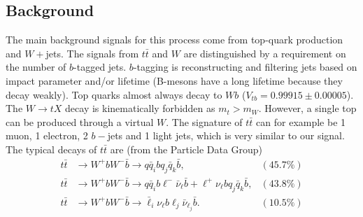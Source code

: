 \documentclass[11pt]{article}
\begin{document}
\subsection*{Background}
\begin{flushleft}
The main background signals for this process come from top-quark production and $W+$jets. The signals from $t \bar{t}$ and $W$ are distinguished by a requirement on the number of $b$-tagged jets. $b$-tagging is reconstructing and filtering jets based on impact parameter and/or lifetime (B-mesons have a long lifetime because they decay weakly). Top quarks almost always decay to $Wb$ ($V_{tb}=0.99915 \pm 0.00005$). The $W \rightarrow tX$ decay is kinematically forbidden as $m_t > m_W$. However, a single top can be produced through a virtual $W$. The signature of $t \bar{t}$ can for example be 1 muon, 1 electron, 2 $b-$jets and 1 light jets, which is very similar to our signal. The typical decays of $t \bar{t}$ are (from the Particle Data Group)
\begin{align*}
t \bar{t} & \rightarrow W^+b W^- \bar{b} \rightarrow q \bar{q}_i b q_j \bar{q}_k \bar{b}, & (45.7\%) \\
t \bar{t} & \rightarrow W^+ b W^- \bar{b} \rightarrow q \bar{q}_i b \ell^- \bar{\nu}_{\ell} \bar{b} + \ell^+ \nu_{\ell} b q_j \bar{q}_k \bar{b}, &(43.8 \%)\\
t \bar{t} & \rightarrow W^+ b W^- \bar{b} \rightarrow \bar{\ell}_i \nu_{\ell} b \ell_j \bar{\nu}_{\ell_j} \bar{b}. &(10.5 \%)
\end{align*}
\end{flushleft}
\end{document}
